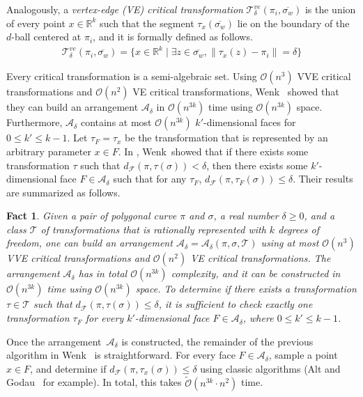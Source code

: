 \documentclass[thm-restate]{lipics-v2021}
\newtheorem{fact}[theorem]{Fact}
\theoremstyle{remark}
\newcommand{\abse}[1]{\lVert #1 \rVert}
\newcommand{\Oh}{\mathcal{O}}
\newcommand{\tOh}{\tilde{\mathcal{O}}}
\newcommand{\df}[1]{d_{\mathcal{F}}(#1)}
\newcommand{\reals}[0]{\mathbb{R}}
\newcommand{\trans}[0]{\mathcal{T}}
\newcommand{\vetrans}[0]{\mathcal{T}^{ve}_\delta}
\newcommand{\cseg}[1]{\overline{#1}}
\begin{document}
Analogously, a \emph{vertex-edge (VE) critical transformation} $\vetrans(\pi_i, \cseg{\sigma_w})$ is the union of every point $x \in \reals^k$ such that the segment $\tau_x(\cseg{\sigma_w})$ lie on the boundary of the $d$-ball centered at $\pi_i$, and it is formally defined as follows. 
\begin{align*}
    \vetrans(\pi_i, \cseg{\sigma_w}) = \{x \in \reals^k \mid \exists z \in \cseg{\sigma_w}, \abse{\tau_x(z) - \pi_i} = \delta\}
\end{align*}

\newcommand{\arrangement}[0]{\mathcal{A_\delta}}
Every critical transformation is a semi-algebraic set. Using $\Oh(n^3)$ VVE critical transformations and $\Oh(n^2)$ VE critical transformations, Wenk~\cite[Proof of Theorem~8]{wenkShapeMatchingHigher2003} showed that they can build an arrangement $\arrangement$ in $\Oh(n^{3k})$ time using $\Oh(n^{3k})$ space. Furthermore, $\arrangement$ contains at most $\Oh(n^{3k})$ $k'$-dimensional faces for $0 \leq k' \leq k - 1$. Let $\tau_F = \tau_x$ be the transformation that is represented by an arbitrary parameter $x \in F$. In \cite[Lemma~24]{wenkShapeMatchingHigher2003}, Wenk~showed that if there exists some transformation $\tau$ such that $\df{\pi, \tau(\sigma)} < \delta$, then there exists some $k'$-dimensional face $F \in \arrangement$ such that for any $\tau_F$, $\df{\pi, \tau_F(\sigma)} \leq \delta$. Their results are summarized as follows. 
\begin{fact} \label{fac:wenk-summarized}
    Given a pair of polygonal curve $\pi$ and $\sigma$, a real number $\delta \geq 0$, and a class $\trans$ of transformations that is rationally represented with $k$ degrees of freedom, one can build an arrangement $\arrangement = \arrangement(\pi, \sigma, \trans)$ using at most $\Oh(n^3)$ VVE critical transformations and $\Oh(n^2)$ VE critical transformations. The arrangement $\arrangement$ has in total $\Oh(n^{3k})$ complexity, and it can be constructed in $\Oh(n^{3k})$ time using $\Oh(n^{3k})$ space. To determine if there exists a transformation $\tau \in \trans$ such that $\df{\pi, \tau(\sigma)} \leq \delta$, it is sufficient to check exactly one transformation $\tau_F$ for every $k'$-dimensional face $F \in \arrangement$, where $0 \leq k ' \leq k - 1$. 
\end{fact}

Once the arrangement~$\arrangement$ is constructed, the remainder of the previous algorithm in Wenk~\cite{wenkShapeMatchingHigher2003} is straightforward. For every face $F \in \arrangement$, sample a point $x \in F$, and determine if $\df{\pi, \tau_x(\sigma)} \leq \delta$ using classic algorithms (Alt and Godau~\cite{altComputingFrechetDistance1995} for example). In total, this takes $\tOh(n^{3k} \cdot n^2)$ time. 
\end{document}
